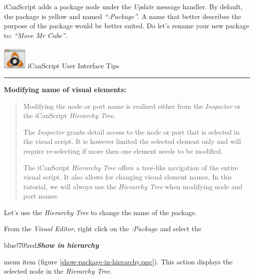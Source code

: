 iCanScript adds a package node under the \emph{Update} message handler. By default, the package is yellow and named \emph{``:Package''}. A name that better describes the purpose of the package would be better suited. Do let's rename your new package to: \emph{``Move Mr Cube''}.
\begin{tipbox}

\includegraphics[width=33pt,height=33pt]{icanscript-ui-tips_32x32x32.png} {\Large \color{black} iCanScript User Interface Tips }

\begin{center}\rule{\textwidth}{0.4pt}\end{center}

\textbf{Modifying name of visual elements:}

\begin{quote}

Modifying the node or port name is realized either from the \emph{Inspector} or the iCanScript \emph{Hierarchy Tree}.

The \emph{Inspector} grants detail access to the node or port that is selected in the visual script. It is however limited the selected element only and will require re-selecting if more then one element needs to be modified.

The iCanScript \emph{Hierarchy Tree} offers a tree-like navigation of the entire visual script. It also allows for changing visual element names. In this tutorial, we will always use the \emph{Hierarchy Tree} when modifying node and port names.
\end{quote}

\end{tipbox}



Let's use the \emph{Hierarchy Tree} to change the name of the package.

From the \emph{Visual Editor}, right click on the \emph{:Package} and select the \begin{color}{blue!70!red}\emph{\textbf{Show in hierarchy}}\end{color} menu item (figure \ref{show-package-in-hierarchy.png}). This action displays the selected node in the \emph{Hierarchy Tree}.


